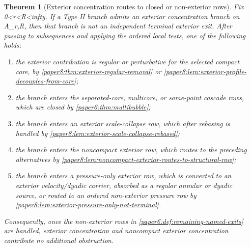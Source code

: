 \documentclass[11pt]{amsart}
\def\({}%
\def\){}%
\def\infty{infty}%
\theoremstyle{plain}
\newtheorem{theorem}{Theorem}[section]
\theoremstyle{definition}
\theoremstyle{remark}
\begin{document}
\begin{theorem}[Exterior concentration routes to closed or non-exterior rows]
\label{paper8:thm:exterior-concentration-routed}
Fix \(0<r<R<\infty\).  If a Type II branch admits an exterior concentration
branch on \(A_{r,R}\), then that branch is not an independent terminal exterior
exit.  After passing to subsequences and applying the ordered local tests, one
of the following holds:
\begin{enumerate}[label=\textup{(\roman*)}]
\item the exterior contribution is regular or perturbative for the selected
compact core, by \cref{paper8:thm:exterior-regular-removal} or
\cref{paper8:lem:exterior-profile-decouples-from-core};
\item the branch enters the separated-core, multicore, or same-point cascade
rows, which are closed by \cref{paper6:thm:multibubble};
\item the branch enters an exterior scale-collapse row, which after rebasing is
handled by \cref{paper8:lem:exterior-scale-collapse-rebased};
\item the branch enters the noncompact exterior row, which routes to the
preceding alternatives by
\cref{paper8:lem:noncompact-exterior-routes-to-structural-row};
\item the branch enters a pressure-only exterior row, which is converted to an
exterior velocity/dyadic carrier, absorbed as a regular annular or dyadic
source, or routed to an ordered non-exterior pressure row by
\cref{paper8:lem:exterior-pressure-only-not-terminal}.
\end{enumerate}
Consequently, once the non-exterior rows in
\cref{paper6:def:remaining-named-exits} are handled, exterior concentration and
noncompact exterior concentration contribute no additional obstruction.
\end{theorem}
\end{document}
